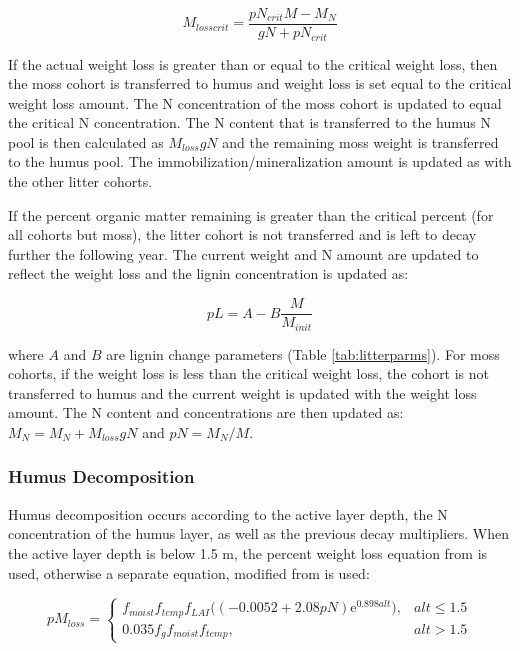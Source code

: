 \documentclass[a4paper, 12pt] {report}
\begin{document}
\begin{equation} 
M_{losscrit} = \frac{pN_{crit}M - M_N}{gN + pN_{crit}}
\end{equation}

If the actual weight loss is greater than or equal to the critical weight loss, then the moss cohort is transferred to humus and weight loss is set equal to the critical weight loss amount. The N concentration of the moss cohort is updated to equal the critical N concentration. The N content that is transferred to the humus N pool is then calculated as $M_{loss}gN$ and the remaining moss weight is transferred to the humus pool. The immobilization/mineralization amount is updated as with the other litter cohorts.

If the percent organic matter remaining is greater than the critical percent (for all cohorts but moss), the litter cohort is not transferred and is left to decay further the following year. The current weight and N amount are updated to reflect the weight loss and the lignin concentration is updated as:

\begin{equation} 
pL = A - B\frac{M}{M_{init}}
\end{equation}

where $A$ and $B$ are lignin change parameters (Table \ref{tab:litterparms}). For moss cohorts, if the weight loss is less than the critical weight loss, the cohort is not transferred to humus and the current weight is updated with the weight loss amount. The N content and concentrations are then updated as: $M_N = M_N + M_{loss}gN$ and $pN = M_N/M$.

\subsubsection{Humus Decomposition}

Humus decomposition occurs according to the active layer depth, the N concentration of the humus layer, as well as the previous decay multipliers. When the active layer depth is below 1.5 m, the percent weight loss equation from  is used, otherwise a separate equation, modified from  is used:

\begin{equation} 
pM_{loss} = \begin{cases}
f_{moist}f_{temp}f_{LAI}\Big((-0.0052 + 2.08pN)\text{e}^{0.898alt}\Big), & \text{$alt \leq 1.5$} \\
0.035f_gf_{moist}f_{temp}, & \text{$alt > 1.5$}
\end{cases}
\end{equation}
\end{document}
